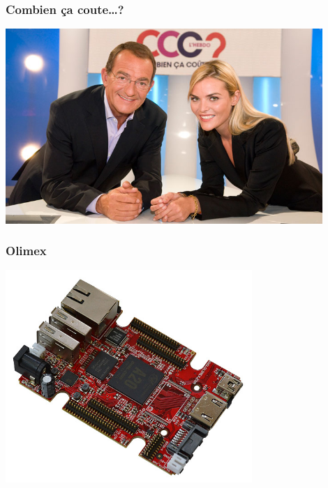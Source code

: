 \documentclass[notes=hide]{beamer}
\begin{document}
\begin{frame}[t,plain]
\begin{center}
\vspace{\fill}
	   \vspace{\fill}
\end{center}
\end{frame}


\begin{frame}[t]
\frametitle{\textcolor{titre}{Combien ça coute…?}}
  \begin{center}
    \includegraphics[width=0.9\textwidth]{img2/combiencacoute.jpg}
  \end{center}
\end{frame}

\begin{frame}[t]
\frametitle{\textcolor{titre}{Olimex}}
  \begin{center}
    \includegraphics[width=0.7\textwidth]{img2/olimex.jpg}
  \end{center}
\end{frame}
\end{document}
